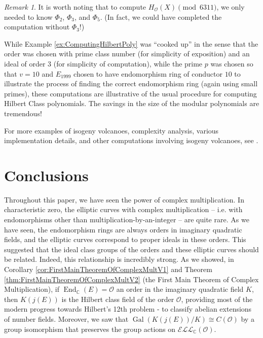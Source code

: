 \documentclass{amsart}
\theoremstyle{definition}
\theoremstyle{remark}
\newtheorem{remark}[thm]{Remark}
\numberwithin{equation}{section}
\newcommand{\cE}{\mathcal E}
\newcommand{\cL}{\mathcal L}
\newcommand{\cO}{\mathcal O}
\newcommand{\bbC}{\mathbb C}
\newcommand{\ELL}{\cE\cL\cL}
\DeclareMathOperator{\End}{End}
\DeclareMathOperator{\Gal}{Gal}
\begin{document}
\begin{remark}
It is worth noting that to compute $H_{\cO}(X) \pmod{6311}$, we only needed to know $\Phi_{2}$, $\Phi_{3}$, and $\Phi_{5}$. (In fact, we could have completed the computation without $\Phi_{3}$!)

While Example \ref{ex:ComputingHilbertPoly} was ``cooked up'' in the sense that the order was chosen with prime class number (for simplicity of exposition) and an ideal of order $3$ (for simplicity of computation), while the prime $p$ was chosen so that $v = 10$ and $E_{1999}$  chosen to have endomorphism ring of conductor $10$ to illustrate the process of finding the correct endomorphism ring (again using small primes), these computations are illustrative of the usual procedure for computing Hilbert Class polynomials. The savings in the size of the modular polynomials are tremendous!
\end{remark}

For more examples of isogeny volcanoes, complexity analysis, various implementation details, and other computations involving isogeny volcanoes, see \cite{SutherlandIV}.

\section{Conclusions}

Throughout this paper, we have seen the power of complex multiplication. In characteristic zero, the elliptic curves with complex multiplication -- i.e. with endomorphisms other than multiplication-by-an-integer -- are quite rare. As we have seen, the endomorphism rings are always orders in imaginary quadratic fields, and the elliptic curves correspond to proper ideals in these orders. This suggested that the ideal class groups of the orders and these elliptic curves should be related. Indeed, this relationship is incredibly strong. As we showed, in Corollary \ref{cor:FirstMainTheoremOfComplexMultV1} and Theorem \ref{thm:FirstMainTheoremOfComplexMultV2} (the First Main Theorem of Complex Multiplication), if $\End_{\bbC}(E) = \cO$ an order in the imaginary quadratic field $K$, then $K(j(E))$ is the Hilbert class field of the order $\cO$, providing most of the modern progress towards Hilbert's 12th problem - to classify abelian extensions of number fields. Moreover, we saw that $\Gal(K(j(E))/K) \cong C(\cO)$ by a group isomorphism that preserves the group actions on $\ELL_{\bbC}(\cO)$.
\end{document}
